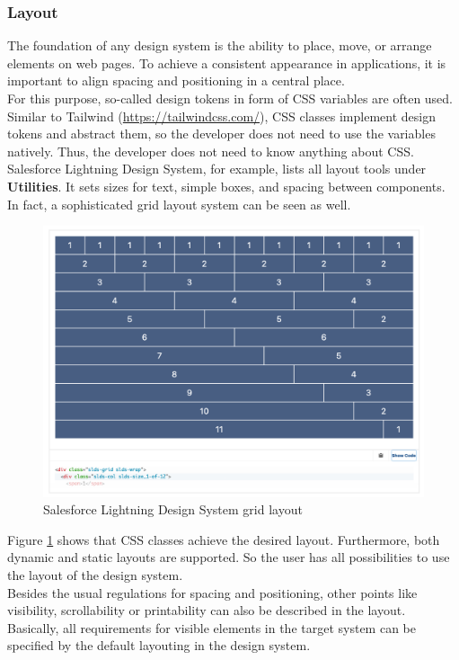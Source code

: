 \subsubsection{Layout} \label{layout}
The foundation of any design system is the ability to place, move, or arrange elements on web pages. To achieve a consistent appearance in applications, it is important to align spacing and positioning in a central place. \\ 
For this purpose, so-called design tokens in form of \ac{CSS} variables are often used. Similar to Tailwind (\url{https://tailwindcss.com/}), \ac{CSS} classes implement design tokens and abstract them, so the developer does not need to use the variables natively. Thus, the developer does not need to know anything about \ac{CSS}.  \\
Salesforce Lightning Design System, for example, lists all layout tools under \textbf{Utilities}. It sets sizes for text, simple boxes, and spacing between components. In fact, a sophisticated grid layout system can be seen as well. \\
\begin{figure}[hbtp]
	\centerline{\includegraphics[width=\linewidth]{images/salesforce_lightning_layout.png}}
	\caption{Salesforce Lightning Design System grid layout \cite{lightning_design_system_lightning_nodate}}
	\label{salesforce_lightning_layout}
\end{figure} 

Figure \ref{salesforce_lightning_layout} shows that \ac{CSS} classes achieve the desired layout. Furthermore, both dynamic and static layouts are supported. So the user has all possibilities to use the layout of the design system.\\
Besides the usual regulations for spacing and positioning, other points like visibility, scrollability or printability can also be described in the layout. Basically, all requirements for visible elements in the target system can be specified by the default layouting in the design system.

